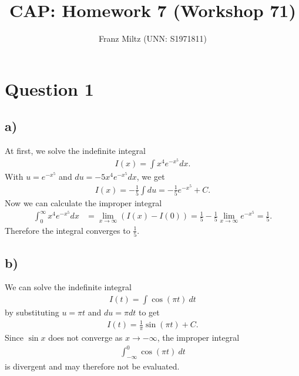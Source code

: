 \documentclass{article}
\title{CAP: Homework 7 (Workshop 71)}
\author{Franz Miltz (UNN: S1971811)}
\begin{document}
\maketitle
\section*{Question 1}
\subsection*{a)}
At first, we solve the indefinite integral
\begin{align*}
  I(x) = \int x^4e^{-x^5}dx.
\end{align*}
With $u=e^{-x^5}$ and $du=-5x^4e^{-x^5}dx$, we get
\begin{align*}
  I(x) = -\frac{1}{5}\int du = -\frac{1}{5}e^{-x^5} + C.
\end{align*}
Now we can calculate the improper integral
\begin{align*}
  \int_0^\infty x^4e^{-x^5}dx &= \lim_{x\to\infty}\left(I(x)-I(0)\right)
  = \frac{1}{5}-\frac{1}{5}\lim_{x\to\infty}e^{-x^5}=\frac{1}{5}.
\end{align*}
Therefore the integral converges to $\frac{1}{5}$.
\subsection*{b)}
We can solve the indefinite integral
\begin{align*}
  I(t) = \int \cos(\pi t)\:dt
\end{align*}
by substituting $u=\pi t$ and $du=\pi dt$ to get
\begin{align*}
  I(t) = \frac{1}{\pi} \sin(\pi t) + C.
\end{align*}
Since $\sin x$ does not converge as $x\to-\infty$, the improper integral
\begin{align*}
  \int_{-\infty}^0\cos(\pi t)\:dt
\end{align*}
is divergent and may therefore not be evaluated.
\end{document}
